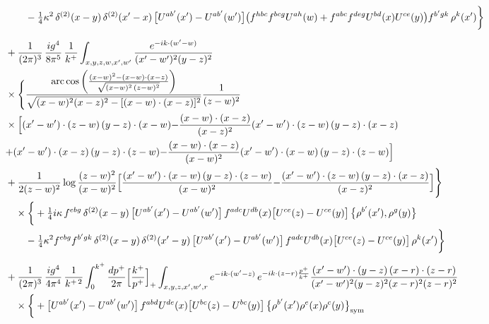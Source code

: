 \documentclass[10pt]{article}
\numberwithin{equation}{section}
\begin{document}
\begin{align}
&\qquad-\tfrac14\kappa^{2}\,\delta^{(2)}(x-y)\,\delta^{(2)}(x^{\prime}-x)\,\big[U^{ab^{\prime}}(x^{\prime})-U^{ab^{\prime}}(w^{\prime})\big]\big(f^{hbc}f^{bcg}U^{ah}(w)+f^{abc}f^{deg}U^{bd}(x)U^{ce}(y)\big)f^{b^{\prime}gk}\,\rho^{k}(x^{\prime})\bigg\}\notag\\[6pt]
&+\frac{1}{(2\pi)^{3}}\,\frac{ig^{4}}{8\pi^{5}}\,\frac{1}{k^{+}}\int_{x,y,z,w,x^{\prime},w^{\prime}}\frac{e^{-ik\cdot(w^{\prime}-w)}}{(x^{\prime}-w^{\prime})^{2}(y-z)^{2}}\notag\\
&\times\Bigg\{\frac{\mathrm{arc\,cos}\left(\frac{(x-w)^{2}-(x-w)\cdot (x-z)}{\sqrt{(x-w)^{2}\,(z-w)^{2}}}\right)}{\sqrt{(x-w)^{2}(x-z)^{2}-[(x-w)\cdot(x-z)]^{2}}}\frac{1}{(z-w)^{2}}\notag\\
&\times\Big[{(x^{\prime}-w^{\prime})\cdot(z-w)\,(y-z)\cdot(x-w)}{-\frac{(x-w)\cdot(x-z)}{(x-z)^{2}}(x^{\prime}-w^{\prime})\cdot(z-w)\,(y-z)\cdot(x-z)}\notag\\
&{+(x^{\prime}-w^{\prime})\cdot(x-z)\,(y-z)\cdot(z-w)}{-\frac{(x-w)\cdot(x-z)}{(x-w)^{2}}(x^{\prime}-w^{\prime})\cdot(x-w)\,(y-z)\cdot(z-w)}\Big]\notag\\
&+\frac{1}{2(z-w)^{2}}\log\frac{(z-w)^{2}}{(x-w)^{2}}\Big[{\frac{(x^{\prime}-w^{\prime})\cdot(x-w)\,(y-z)\cdot(z-w)}{(x-w)^{2}}}{-\frac{(x^{\prime}-w^{\prime})\cdot(z-w)\,(y-z)\cdot(x-z)}{(x-z)^{2}}}\Big]\Bigg\}\notag\\
&\quad\times\bigg\{+\tfrac14 i\kappa\,f^{ebg}\,\delta^{(2)}(x-y)\,\big[U^{ab^{\prime}}(x^{\prime})-U^{ab^{\prime}}(w^{\prime})\big]\,f^{adc}U^{db}(x)\big[U^{ce}(z)-U^{ce}(y)\big]\,\big\{\rho^{b^{\prime}}(x^{\prime}),\rho^{g}(y)\big\}\notag\\
&\qquad-\tfrac14\kappa^{2}f^{ebg}f^{b^{\prime}gk}\,\delta^{(2)}(x-y)\,\delta^{(2)}(x^{\prime}-y)\,\big[U^{ab^{\prime}}(x^{\prime})-U^{ab^{\prime}}(w^{\prime})\big]\,f^{adc}U^{db}(x)\big[U^{ce}(z)-U^{ce}(y)\big]\,\rho^{k}(x^{\prime})\bigg\}\notag\\[6pt]
&+\frac{1}{(2\pi)^{3}}\,\frac{ig^{4}}{4\pi^{4}}\,\frac{1}{k^{+\,2}}\int_{0}^{k^{+}}\frac{dp^{+}}{2\pi}\Big[\frac{k^{+}}{p^{+}}\Big]_{+}\int_{x,y,z,x^{\prime},w^{\prime},r}e^{-ik\cdot(w^{\prime}-z)}\,e^{-ik\cdot(z-r)\frac{p^{+}}{k^{+}}}\frac{(x^{\prime}-w^{\prime})\cdot(y-z)\,(x-r)\cdot(z-r)}{(x^{\prime}-w^{\prime})^{2}(y-z)^{2}(x-r)^{2}(z-r)^{2}}\notag\\
&\quad\times\bigg\{+\big[U^{ab^{\prime}}(x^{\prime})-U^{ab^{\prime}}(w^{\prime})\big]\,f^{abd}U^{de}(x)\big[U^{bc}(z)-U^{bc}(y)\big]\,\big\{\rho^{b^{\prime}}(x^{\prime})\rho^{e}(x)\rho^{c}(y)\big\}_{\rm sym}\notag\\

\end{align}
\end{document}
